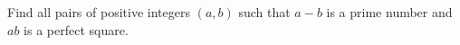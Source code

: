 Find all pairs of positive integers $(a,b)$ such that $a-b$ is a prime number and $ab$ is a perfect square.